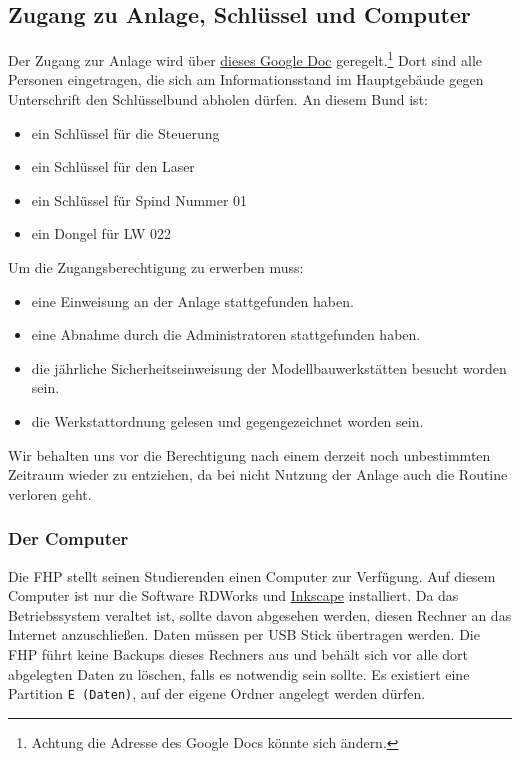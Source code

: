 \documentclass[]{article}
\providecommand{\tightlist}{%
  \setlength{\itemsep}{0pt}\setlength{\parskip}{0pt}}
\begin{document}
\hypertarget{zugang-zu-anlage-schluxfcssel-und-computer}{%
\subsection{Zugang zu Anlage, Schlüssel und
Computer}\label{zugang-zu-anlage-schluxfcssel-und-computer}}

Der Zugang zur Anlage wird über
\href{https://docs.google.com/spreadsheets/d/1I4rYd23biIntc6wfrVsdPKd0qprd70GNY0aXA4jAOJA/edit\#gid=0}{dieses
Google Doc} geregelt.\footnote{Achtung die Adresse des Google Docs
  könnte sich ändern.} Dort sind alle Personen eingetragen, die sich am
Informationsstand im Hauptgebäude gegen Unterschrift den Schlüsselbund
abholen dürfen. An diesem Bund ist:

\begin{itemize}
\tightlist
\item
  ein Schlüssel für die Steuerung
\item
  ein Schlüssel für den Laser
\item
  ein Schlüssel für Spind Nummer 01
\item
  ein Dongel für LW 022
\end{itemize}

Um die Zugangsberechtigung zu erwerben muss:

\begin{itemize}
\tightlist
\item
  eine Einweisung an der Anlage stattgefunden haben.
\item
  eine Abnahme durch die Administratoren stattgefunden haben.
\item
  die jährliche Sicherheitseinweisung der Modellbauwerkstätten besucht
  worden sein.
\item
  die Werkstattordnung gelesen und gegengezeichnet worden sein.
\end{itemize}

Wir behalten uns vor die Berechtigung nach einem derzeit noch
unbestimmten Zeitraum wieder zu entziehen, da bei nicht Nutzung der
Anlage auch die Routine verloren geht.

\hypertarget{der-computer}{%
\subsubsection{Der Computer}\label{der-computer}}

Die FHP stellt seinen Studierenden einen Computer zur Verfügung. Auf
diesem Computer ist nur die Software RDWorks und
\href{https://inkscape.org/en/}{Inkscape} installiert. Da das
Betriebssystem veraltet ist, sollte davon abgesehen werden, diesen
Rechner an das Internet anzuschließen. Daten müssen per USB Stick
übertragen werden. Die FHP führt keine Backups dieses Rechners aus und
behält sich vor alle dort abgelegten Daten zu löschen, falls es
notwendig sein sollte. Es existiert eine Partition \texttt{E\ (Daten)},
auf der eigene Ordner angelegt werden dürfen.
\end{document}
